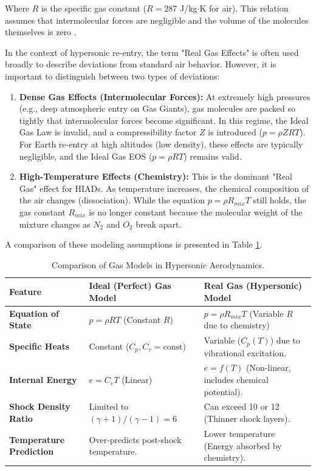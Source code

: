 Where $R$ is the specific gas constant ($R = 287$ J/kg$\cdot$K for air). This relation assumes that intermolecular forces are negligible and the volume of the molecules themselves is zero \cite{AndersonHypersonic}.



In the context of hypersonic re-entry, the term "Real Gas Effects" is often used broadly to describe deviations from standard air behavior. However, it is important to distinguish between two types of deviations:

\begin{enumerate}
    \item \textbf{Dense Gas Effects (Intermolecular Forces):} At extremely high pressures (e.g., deep atmospheric entry on Gas Giants), gas molecules are packed so tightly that intermolecular forces become significant. In this regime, the Ideal Gas Law is invalid, and a compressibility factor $Z$ is introduced ($p = \rho Z R T$). For Earth re-entry at high altitudes (low density), these effects are typically negligible, and the Ideal Gas EOS ($p = \rho R T$) remains valid.
    
    \item \textbf{High-Temperature Effects (Chemistry):} This is the dominant "Real Gas" effect for HIADs. As temperature increases, the chemical composition of the air changes (dissociation). While the equation $p = \rho R_{mix} T$ still holds, the gas constant $R_{mix}$ is no longer constant because the molecular weight of the mixture changes as $N_2$ and $O_2$ break apart.
\end{enumerate}

A comparison of these modeling assumptions is presented in Table \ref{tab:gas_models}.

\begin{table}[H]
    \centering
    \caption{Comparison of Gas Models in Hypersonic Aerodynamics.}
    \label{tab:gas_models}
    \begin{tabularx}{\textwidth}{|l|X|X|}
        \hline
        \rowcolor{gray!20} \textbf{Feature} & \textbf{Ideal (Perfect) Gas Model} & \textbf{Real Gas (Hypersonic) Model} \\ \hline
        \textbf{Equation of State} & $p = \rho R T$ (Constant $R$) & $p = \rho R_{mix} T$ (Variable $R$ due to chemistry) \\ \hline
        \textbf{Specific Heats} & Constant ($C_p, C_v = \text{const}$) & Variable ($C_p(T)$) due to vibrational excitation. \\ \hline
        \textbf{Internal Energy} & $e = C_v T$ (Linear) & $e = f(T)$ (Non-linear, includes chemical potential). \\ \hline
        \textbf{Shock Density Ratio} & Limited to $(\gamma+1)/(\gamma-1) = 6$ & Can exceed 10 or 12 (Thinner shock layers). \\ \hline
        \textbf{Temperature Prediction} & Over-predicts post-shock temperature. & Lower temperature (Energy absorbed by chemistry). \\ \hline
    \end{tabularx}
\end{table}

